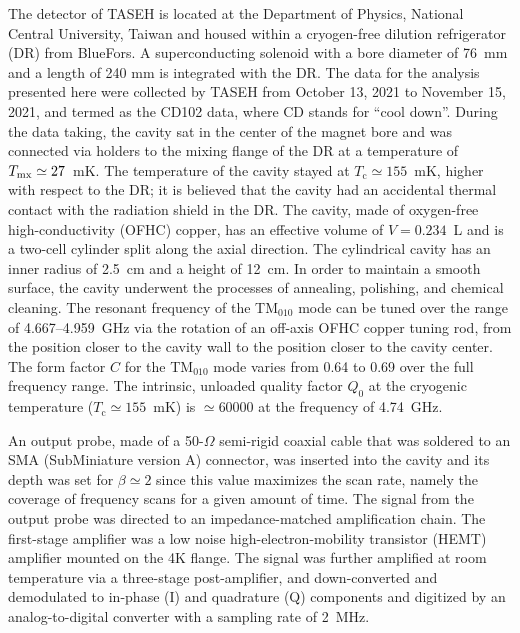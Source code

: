 \documentclass[%
 reprint,prl, %
 amsmath,amssymb,
 aps,
]{revtex4-2}
\begin{document}
The detector of TASEH is located at the Department of Physics, National 
Central University, Taiwan and housed within a cryogen-free dilution 
refrigerator (DR) from BlueFors. A superconducting solenoid 
with a 
bore diameter of 76~mm and a length of 240 mm is integrated with the DR. 
%
The data for the analysis presented here were collected by TASEH 
from October 13, 2021 to November 15, 2021, and termed as the CD102 data, 
where CD stands for ``cool down''. 
During the data taking, the cavity sat in the center of the magnet bore 
and was connected via holders to the mixing flange of the DR at a 
temperature of $T_{\rm mx}\simeq27$~mK. 
The temperature of the cavity stayed at $T_\text{c}\simeq155$~mK, higher 
with respect to the 
DR; it is believed that the cavity had an accidental thermal contact with the 
radiation shield in the DR. 
The cavity, made of oxygen-free high-conductivity (OFHC) copper, has an 
effective volume of $V=0.234$~L and is a two-cell cylinder split along 
the axial direction. 
The cylindrical cavity has an inner radius of 2.5~cm and a 
height of 12~cm.  In order to maintain a smooth surface, the cavity underwent 
the processes of annealing, polishing, and chemical cleaning. The resonant 
frequency of the TM$_{010}$ mode can be tuned over the range of 
4.667--4.959~GHz via the rotation of an off-axis OFHC copper tuning rod, from 
the position closer to the cavity wall to the position closer to the cavity 
center. The form factor $C$ for 
the TM$_{010}$ mode varies from 0.64 to 0.69 over the 
full frequency range.  
The intrinsic, unloaded quality factor $Q_0$ at the cryogenic temperature 
($T_\mathrm{c}\simeq 155$~mK) is $\simeq 60000$ at the frequency of 
4.74~GHz.


An output probe, made of a 50-$\Omega$ semi-rigid coaxial cable that was 
soldered to an SMA (SubMiniature version A) connector, was inserted into the 
cavity and its depth was set for 
$\beta\simeq2$ since this value maximizes the scan rate, namely the coverage 
of frequency scans for a given amount of time. 
The signal from the output probe was directed to an 
impedance-matched amplification chain. The first-stage amplifier was 
a low noise high-electron-mobility transistor (HEMT) amplifier 
mounted on the 4K flange. 
The signal was further amplified at room temperature via a 
three-stage post-amplifier, and down-converted 
and demodulated to in-phase (I) and quadrature (Q) components and digitized 
by an analog-to-digital converter with a sampling rate of 2~MHz. 
\end{document}
